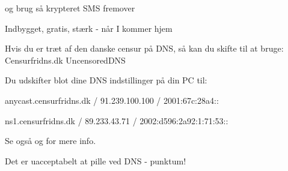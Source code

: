 \documentclass[20pt,landscape,a4paper,footrule]{foils}
\begin{document}
og brug så krypteret SMS fremover \smiley



\centerline{Indbygget, gratis, stærk - når I kommer hjem}



Hvis du er træt af den danske censur på DNS, så kan du skifte til at bruge:
Censurfridns.dk UncensoredDNS

Du udskifter blot dine DNS indstillinger på din PC til:
\begin{list2}
\item anycast.censurfridns.dk / 91.239.100.100 / 2001:67c:28a4::
\item ns1.censurfridns.dk / 89.233.43.71 / 2002:d596:2a92:1:71:53::
\end{list2}
Se også  og  for mere info.

\vskip 2cm

\centerline{\Large Det er uacceptabelt at pille ved DNS - punktum!}


\myquestionspage
\end{document}

